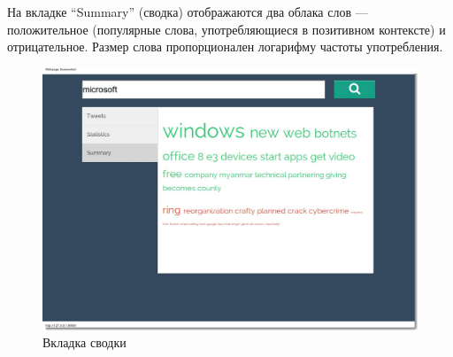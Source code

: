 На вкладке ``Summary'' (сводка) отображаются два облака слов --- положительное 
(популярные слова, употребляющиеся в позитивном контексте) и отрицательное.
Размер слова пропорционален логарифму частоты употребления.
\begin{figure}[!ht]
\begin{center}
\includegraphics[scale=0.4, trim=20mm 60mm 20mm 10mm, clip]{../resources/screens/summary.png}
\caption{Вкладка сводки}
\label{gr:summary}
\end{center}
\end{figure} 

\clearpage{}
